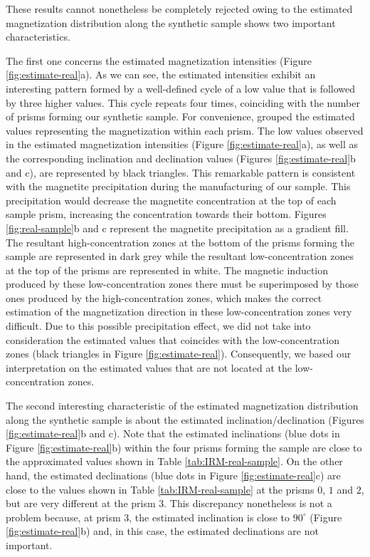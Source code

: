 \documentclass[draft,gc]{agutex}
\begin{document}
\begin{article}
These results cannot nonetheless be completely rejected owing to
the estimated magnetization
distribution along the synthetic sample shows two important 
characteristics. 

The first one concerns the estimated magnetization intensities 
(Figure \ref{fig:estimate-real}a).
As we can see, the estimated intensities exhibit an interesting pattern 
formed by a well-defined cycle of a low value that is followed by three higher 
values. This cycle repeats four times,
coinciding with the number of prisms forming our synthetic
sample.
For convenience, grouped the estimated values representing
the magnetization within each prism.
The low values observed in the estimated magnetization intensities
(Figure \ref{fig:estimate-real}a), as well
as the corresponding inclination and declination values
(Figures \ref{fig:estimate-real}b and c), are represented by black
triangles.
This remarkable pattern is consistent with the 
magnetite precipitation during the manufacturing of our sample.
This precipitation would decrease the magnetite concentration at the
top of each sample prism, increasing the concentration towards
their bottom.
Figures \ref{fig:real-sample}b and c represent the magnetite 
precipitation as a gradient fill. The resultant
high-concentration zones at the bottom of the prisms forming the 
sample are represented in dark grey while the resultant
low-concentration zones at the top of the prisms are represented
in white. 
The magnetic induction produced by these low-concentration zones
there must be superimposed by those ones produced by the 
high-concentration zones, which makes the correct estimation 
of the magnetization direction in these low-concentration zones 
very difficult.
Due to this possible precipitation effect, 
we did not take into consideration the estimated values that coincides
with the low-concentration zones 
(black triangles in Figure \ref{fig:estimate-real}). Consequently,
we based our interpretation on the estimated values that are 
not located at the low-concentration zones.

The second interesting characteristic of the estimated magnetization
distribution along the synthetic sample is about the estimated
inclination/declination (Figures \ref{fig:estimate-real}b and c).
Note that the estimated inclinations (blue dots in Figure 
\ref{fig:estimate-real}b) within the four prisms forming
the sample are close to the approximated values shown in Table 
\ref{tab:IRM-real-sample}.
On the other hand, the estimated declinations (blue dots in Figure 
\ref{fig:estimate-real}c) are close to the values shown in Table 
\ref{tab:IRM-real-sample} at the prisms $0$, $1$ and $2$, but are 
very different at the prism $3$.
This discrepancy nonetheless is not a problem because, at prism $3$,
the estimated inclination is close to $90^{\circ}$ (Figure
\ref{fig:estimate-real}b) and, in this case, the estimated declinations
are not important.


\end{article}
\end{document}
